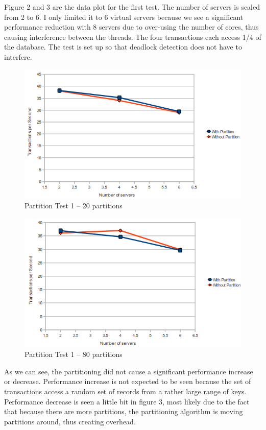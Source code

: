 \documentclass[a4paper, 10pt, notitlepage]{report}
\begin{document}
Figure 2 and 3 are the data plot for the first test. The number of servers is scaled from 2 to 6. I only
limited it to 6 virtual servers because we see a significant performance reduction with 8 servers due to over-using the number
of cores, thus causing interference between the threads. The four transactions each access 1/4 of the database. The test is 
set up so that deadlock detection does not have to interfere. 

\begin{figure}[h!]

  \centering
    \includegraphics[scale=0.7]{peval1.png}
  \caption{Partition Test 1 -- 20 partitions}
\end{figure}

\begin{figure}[h!]

  \centering
    \includegraphics[scale=0.7]{peval2.png}
  \caption{Partition Test 1 -- 80 partitions}
\end{figure}

As we can see, the partitioning did not cause a significant performance increase or decrease. Performance increase is not expected to be seen because
the set of transactions access a random set of records from a rather large range of keys. Performance decrease is seen a little bit
in figure 3, most likely due to the fact that because there are more partitions, the partitioning algorithm is moving partitions
around, thus creating overhead.
\end{document}
